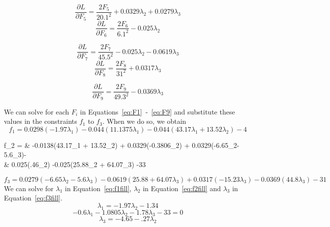 \documentclass[11pt]{scrartcl}
\begin{document}
\begin{multicols}{2}
	\begin{equation}
		\label{eq:F5}
		\frac{\partial L}{\partial F_5} = \frac{2F_5}{20.1^2} +0.0329\lambda_2+0.0279\lambda_3
	\end{equation}
	\begin{equation}
		\label{eq:F6}
		\frac{\partial L}{\partial F_6} = \frac{2F_6}{6.1^2} - 0.025\lambda_2 
	\end{equation}
\end{multicols}
\begin{multicols}{2}
	\begin{equation}
		\label{eq:F7}
		\frac{\partial L}{\partial F_7} = \frac{2F_7}{45.5^2} -0.025\lambda_2-0.0619\lambda_3
	\end{equation}
	\begin{equation}
		\label{eq:F8}
		\frac{\partial L}{\partial F_8} = \frac{2F_8}{31^2} +0.0317\lambda_3
	\end{equation}
\end{multicols}

\begin{equation}
\label{eq:F9}
\frac{\partial L}{\partial F_9} = \frac{2F_9}{49.3^2} -0.0369\lambda_3
\end{equation}

We can solve for each $F_i$ in Equations~\ref{eq:F1}~-~\ref{eq:F9} and substitute these values 
in the constraints $f_1$ to $f_3$.
When we do so, we obtain
\begin{equation}
		\label{eq:f1fill}
		f_1 = 0.0298(-1.97\lambda_1) - 0.044(11.1375\lambda_1)-0.044(43.17\lambda_1 + 13.52\lambda_2)-4
\end{equation}
		\begin{flalign}
		\label{eq:f2fill}
		f_2 = & -0.0138(43.17\lambda_1 + 13.52\lambda_2) + 0.0329(-0.3806\lambda_2) + 0.0329(-6.65\lambda_2-5.6\lambda_3)- \\
		& 0.025(.46\lambda_2) -0.025(25.88\lambda_2 + 64.07\lambda_3) -33
		\end{flalign}
\begin{equation}
	\label{eq:f3fill}
	f_3 = 0.0279(-6.65\lambda_2 -5.6\lambda_3)-0.0619(25.88+64.07\lambda_3)+0.0317(-15.23\lambda_3) - 0.0369(44.8\lambda_3)-31
\end{equation}
We can solve for $\lambda_1$ in Equation~\ref{eq:f1fill}, $\lambda_2$ in Equation~\ref{eq:f2fill} and $\lambda_3$ in Equation~\ref{eq:f3fill}.
\begin{equation}
	\label{eq:lambda1}
	\lambda_1 = -1.97\lambda_2 -1.34
\end{equation}
\begin{equation}
		\label{eq:lambda2}
		-0.6\lambda_1 -1.0805\lambda_2-1.78\lambda_3-33=0
\end{equation}
\begin{equation}
		\label{eq:lambda3}
\lambda_3 = -4.65-.27\lambda_2
\end{equation}
\end{document}
